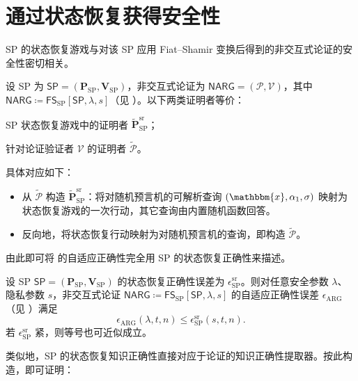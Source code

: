 \documentclass[american,singlepageview]{snargs-book-zh}
\newcommand{\Malicious}[1]{\tilde{#1}}
\newcommand{\DefineEqual}{\coloneqq}
\newcommand{\Instance}{\mathbbm{x}}
\newcommand{\InstanceSize}{n}
\newcommand{\ProtoProver}{P}
\newcommand{\ProtoVerifier}{V}
\newcommand{\ProtoSoundnessError}{\epsilon}
\newcommand{\SRSuperscript}{\mathrm{sr}}
\newcommand{\ProtoSRSoundnessError}{\ProtoSoundnessError^{\SRSuperscript}}
\newcommand{\SPSymbol}{\mathsf{SP}}
\newcommand{\SPSubscript}{\scriptscriptstyle\mathrm{SP}}
\newcommand{\SPFormat}[1]{\mathbf{#1}}
\newcommand{\SPProver}{\SPFormat{\ProtoProver}_{\SPSubscript}}
\newcommand{\SPVerifier}{\SPFormat{\ProtoVerifier}_{\SPSubscript}}
\newcommand{\SPMaliciousProver}{\Malicious{\SPFormat{\ProtoProver}}_{\SPSubscript}}
\newcommand{\SPSystem}{(\SPProver,\SPVerifier)}
\newcommand{\SPCommitment}{\alpha_{1}}
\newcommand{\NARGSymbol}{\mathsf{NARG}}
\newcommand{\ARGSubscript}{\scriptscriptstyle\mathrm{ARG}}
\newcommand{\ARGFormat}[1]{\mathcal{#1}}
\newcommand{\ARGProver}{\ARGFormat{\ProtoProver}}
\newcommand{\ARGVerifier}{\ARGFormat{\ProtoVerifier}}
\newcommand{\ARGSystem}{(\ARGProver,\ARGVerifier)}
\newcommand{\ARGSoundnessError}{\ProtoSoundnessError_{\ARGSubscript}}
\newcommand{\ROQueryBound}{t}
\newcommand{\SecurityParameter}{\lambda}
\newcommand{\PrivacyParameter}{s}
\newcommand{\FormatTransName}[1]{\bm{\mathsf{#1}}}
\newcommand{\FSonSPSymbol}{\FormatTransName{FS}_{\SPSubscript}}
\newcommand{\FormatTransInputs}[3]{[#1,#2,#3]}
\newcommand{\FSonSPTransformation}[3]{\FSonSPSymbol\FormatTransInputs{#1}{#2}{#3}}
\newcommand{\SRSaltString}{\sigma}
\newcommand{\SPSRSoundnessError}{\ProtoSRSoundnessError_{\SPSubscript}}
\newcommand{\SPMaliciousSRProver}{\SPMaliciousProver^{\SRSuperscript}}
\begin{document}
\section{通过状态恢复获得安全性}
\label{section:sp-fs-via-sr}

SP 的状态恢复游戏与对该 SP 应用 Fiat--Shamir 变换后得到的非交互式论证的安全性密切相关。

设 SP 为 $\SPSymbol=\SPSystem$，非交互式论证为 $\NARGSymbol=\ARGSystem$，其中
\(\NARGSymbol\DefineEqual\FSonSPTransformation{\SPSymbol}{\SecurityParameter}{\PrivacyParameter}\)（见 ）。以下两类证明者等价：
\begin{inparaenum}[(i)]
  \item SP 状态恢复游戏中的证明者 $\SPMaliciousSRProver$；
  \item 针对论证验证者 $\ARGVerifier$ 的证明者 $\Malicious{\ARGProver}$。
\end{inparaenum}
具体对应如下：
\begin{itemize}[noitemsep]
  \item 从 $\Malicious{\ARGProver}$ 构造 $\SPMaliciousSRProver$：将对随机预言机的可解析查询 $(\Instance,\SPCommitment,\SRSaltString)$ 映射为状态恢复游戏的一次行动，其它查询由内置随机函数回答。
  \item 反向地，将状态恢复行动映射为对随机预言机的查询，即构造 $\Malicious{\ARGProver}$。
\end{itemize}
由此即可将  的自适应正确性完全用 SP 的状态恢复正确性来描述。

\begin{lemma}
\label{lemma:fs-for-sigma-protocol-adaptive-soundness}
设 SP $\SPSymbol=\SPSystem$ 的状态恢复正确性误差为 $\SPSRSoundnessError$。则对任意安全参数 $\SecurityParameter$、隐私参数 $\PrivacyParameter$，非交互式论证
\(\NARGSymbol\DefineEqual\FSonSPTransformation{\SPSymbol}{\SecurityParameter}{\PrivacyParameter}\)
的自适应正确性误差 $\ARGSoundnessError$（见 ）满足
\[
  \ARGSoundnessError(\SecurityParameter,\ROQueryBound,\InstanceSize)
  \le
  \SPSRSoundnessError(\PrivacyParameter,\ROQueryBound,\InstanceSize).
\]
若 $\SPSRSoundnessError$ 紧，则等号也可近似成立。
\end{lemma}

类似地，SP 的状态恢复知识正确性直接对应于论证的知识正确性提取器。按此构造，即可证明：
\end{document}
